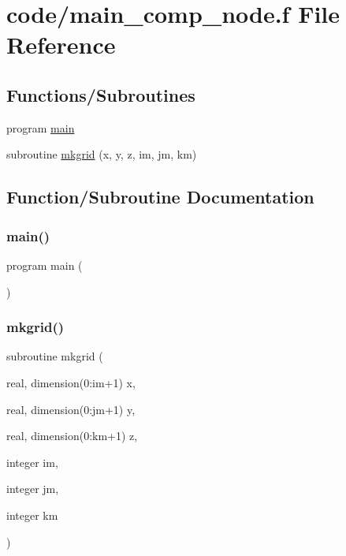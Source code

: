 \hypertarget{main__comp__node_8f}{}\section{code/main\+\_\+comp\+\_\+node.f File Reference}
\label{main__comp__node_8f}
\subsection*{Functions/\+Subroutines}
\begin{DoxyCompactItemize}
\item 
program \hyperlink{main__comp__node_8f_a8ec2266d83cd6c0b762cbcbc92c0af3d}{main}
\item 
subroutine \hyperlink{main__comp__node_8f_a257f7cef7cb961317e0772d235bd8af1}{mkgrid} (x, y, z, im, jm, km)
\end{DoxyCompactItemize}


\subsection{Function/\+Subroutine Documentation}
\mbox{\label{main__comp__node_8f_a8ec2266d83cd6c0b762cbcbc92c0af3d}} 
\subsubsection{\texorpdfstring{main()}{main()}}
{\footnotesize\ttfamily program main (\begin{DoxyParamCaption}{ }\end{DoxyParamCaption})}

\mbox{\label{main__comp__node_8f_a257f7cef7cb961317e0772d235bd8af1}} 
\subsubsection{\texorpdfstring{mkgrid()}{mkgrid()}}
{\footnotesize\ttfamily subroutine mkgrid (\begin{DoxyParamCaption}\item[{real, dimension(0\+:im+1)}]{x,  }\item[{real, dimension(0\+:jm+1)}]{y,  }\item[{real, dimension(0\+:km+1)}]{z,  }\item[{integer}]{im,  }\item[{integer}]{jm,  }\item[{integer}]{km }\end{DoxyParamCaption})}

